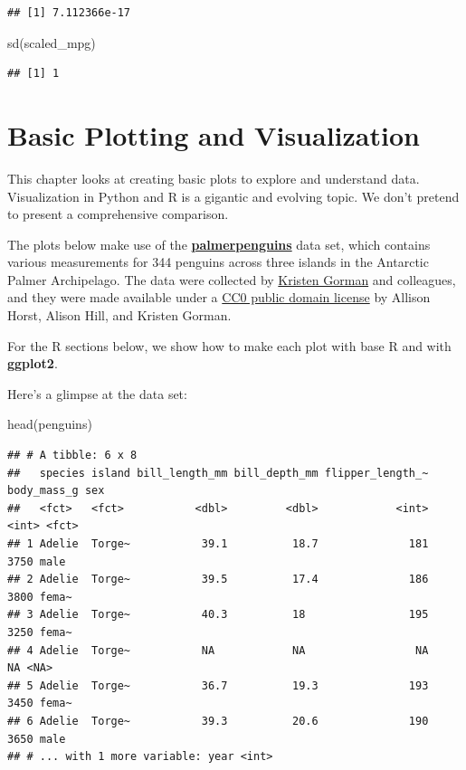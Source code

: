\documentclass[
]{book}
\newenvironment{Shaded}{\begin{snugshade}}{\end{snugshade}}
\newcommand{\FunctionTok}[1]{\textcolor[rgb]{0.00,0.00,0.00}{#1}}
\newcommand{\NormalTok}[1]{#1}
\begin{document}
\begin{verbatim}
## [1] 7.112366e-17
\end{verbatim}

\begin{Shaded}
\begin{Highlighting}[]
\FunctionTok{sd}\NormalTok{(scaled\_mpg)}
\end{Highlighting}
\end{Shaded}

\begin{verbatim}
## [1] 1
\end{verbatim}

\hypertarget{basic-plotting-and-visualization}{%
\chapter{Basic Plotting and Visualization}\label{basic-plotting-and-visualization}}

This chapter looks at creating basic plots to explore and understand data. Visualization in Python and R is a gigantic and evolving topic. We don't pretend to present a comprehensive comparison.

The plots below make use of the \href{https://allisonhorst.github.io/palmerpenguins/}{\textbf{palmerpenguins}} data set, which contains various measurements for 344 penguins across three islands in the Antarctic Palmer Archipelago. The data were collected by \href{https://www.uaf.edu/cfos/people/faculty/detail/kristen-gorman.php}{Kristen Gorman} and colleagues, and they were made available under a \href{https://creativecommons.org/share-your-work/public-domain/cc0/}{CC0 public domain license} by Allison Horst, Alison Hill, and Kristen Gorman.

For the R sections below, we show how to make each plot with base R and with \textbf{ggplot2}.

Here's a glimpse at the data set:

\begin{Shaded}
\begin{Highlighting}[]
\FunctionTok{head}\NormalTok{(penguins)}
\end{Highlighting}
\end{Shaded}

\begin{verbatim}
## # A tibble: 6 x 8
##   species island bill_length_mm bill_depth_mm flipper_length_~ body_mass_g sex  
##   <fct>   <fct>           <dbl>         <dbl>            <int>       <int> <fct>
## 1 Adelie  Torge~           39.1          18.7              181        3750 male 
## 2 Adelie  Torge~           39.5          17.4              186        3800 fema~
## 3 Adelie  Torge~           40.3          18                195        3250 fema~
## 4 Adelie  Torge~           NA            NA                 NA          NA <NA> 
## 5 Adelie  Torge~           36.7          19.3              193        3450 fema~
## 6 Adelie  Torge~           39.3          20.6              190        3650 male 
## # ... with 1 more variable: year <int>
\end{verbatim}
\end{document}
